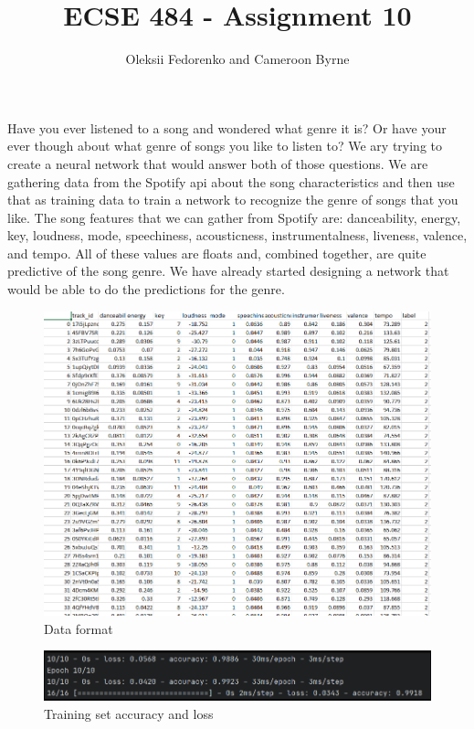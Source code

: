 \documentclass[12pt, oneside, a4paper]{article}
\begin{document}
 
    \title{\textbf{ECSE 484 - Assignment 10}}
    \author{Oleksii Fedorenko and Cameroon Byrne}
    \maketitle
    
    Have you ever listened to a song and wondered what genre it is? Or have your ever though about what genre of songs you like to listen to? We ary trying to create a neural network that would answer both of those questions. We are gathering data from the Spotify api about the song characteristics and then use that as training data to train a network to recognize the genre of songs that you like. The song features that we can gather from Spotify are: danceability, energy, key, loudness, mode, speechiness, acousticness, instrumentalness, liveness, valence, and tempo. All of these values are floats and, combined together, are quite predictive of the song genre. We have already started designing a network that would be able to do the predictions for the genre.  
    
    \FloatBarrier 
    \begin{figure}[H]
        \caption{Data format} 
        \centerline{
        \includegraphics[width=\textwidth]{data.PNG}
        } 
    \end{figure}

    \FloatBarrier 
    \begin{figure}[H]
        \caption{Training set accuracy and loss} 
        \centerline{
        \includegraphics[width=\textwidth]{tarining_set_loss_acc.PNG}
        } 
    \end{figure}
    
\end{document}
